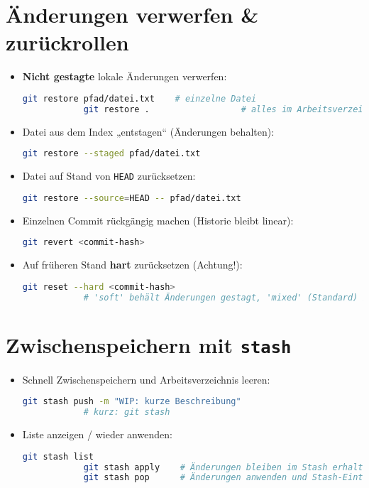\documentclass[a4paper,11pt]{article}
\begin{document}
	\section{Änderungen verwerfen \& zurückrollen}
	\begin{itemize}
		\item \textbf{Nicht gestagte} lokale Änderungen verwerfen:
		\begin{lstlisting}[language=bash]
			git restore pfad/datei.txt    # einzelne Datei
			git restore .                  # alles im Arbeitsverzeichnis
		\end{lstlisting}
		\item Datei aus dem Index „entstagen“ (Änderungen behalten):
		\begin{lstlisting}[language=bash]
			git restore --staged pfad/datei.txt
		\end{lstlisting}
		\item Datei auf Stand von \texttt{HEAD} zurücksetzen:
		\begin{lstlisting}[language=bash]
			git restore --source=HEAD -- pfad/datei.txt
		\end{lstlisting}
		\item Einzelnen Commit rückgängig machen (Historie bleibt linear):
		\begin{lstlisting}[language=bash]
			git revert <commit-hash>
		\end{lstlisting}
		\item Auf früheren Stand \textbf{hart} zurücksetzen (Achtung!):
		\begin{lstlisting}[language=bash]
			git reset --hard <commit-hash>
			# 'soft' behält Änderungen gestagt, 'mixed' (Standard) behält sie ungestagt
		\end{lstlisting}
	\end{itemize}
	
	\section{Zwischenspeichern mit \texttt{stash}}
	\begin{itemize}
		\item Schnell Zwischenspeichern und Arbeitsverzeichnis leeren:
		\begin{lstlisting}[language=bash]
			git stash push -m "WIP: kurze Beschreibung"
			# kurz: git stash
		\end{lstlisting}
		\item Liste anzeigen / wieder anwenden:
		\begin{lstlisting}[language=bash]
			git stash list
			git stash apply    # Änderungen bleiben im Stash erhalten
			git stash pop      # Änderungen anwenden und Stash-Eintrag entfernen
		\end{lstlisting}
	\end{itemize}
	
\end{document}
